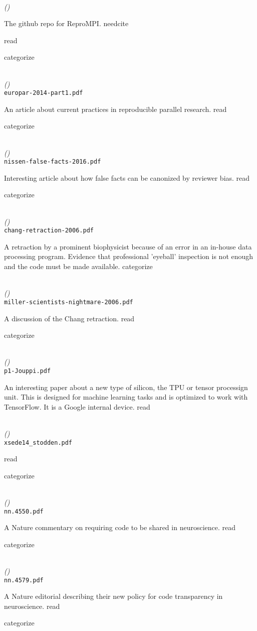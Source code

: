 \documentclass{article}
\newcommand{\Read}{
	\gls{read}
}
\newcommand{\categorize}{
	\gls{categorize}
}
\newcommand{\needcite}{
	\gls{needcite}
}
\newenvironment{refdef}[2] {
	\noindent \textbf{\citetitle{#1}} \cite{#1}\\ \citejournalorbooktitle{#1} \textit{(\citeyear{#1})}\\ \texttt{#2} \vspace{0.2in} \par 
} {
\vspace{0.2in}
}
\begin{document}
\begin{refdef}{reprompi}{}
The github repo for ReproMPI. \needcite \Read \categorize
\end{refdef}

\begin{refdef}{Carpen-Amarie-repro-research-2014}{europar-2014-part1.pdf}
An article about current practices in reproducible parallel research. \Read \categorize
\end{refdef}

\begin{refdef}{nissen-false-facts-2016}{nissen-false-facts-2016.pdf}
Interesting article about how false facts can be canonized by reviewer bias. \Read \categorize
\end{refdef}

\begin{refdef}{chang-retraction-2006}{chang-retraction-2006.pdf}
A retraction by a prominent biophysicist because of an error in an in-house data processing program. Evidence that professional 'eyeball' inspection is not enough and the code must be made available. \categorize
\end{refdef}

\begin{refdef}{miller-scientists-nightmare-2006}{miller-scientists-nightmare-2006.pdf}
A discussion of the Chang retraction. \Read \categorize
\end{refdef}

\begin{refdef}{jouppi-tpu-performance-2017}{p1-Jouppi.pdf}
An interesting paper about a new type of silicon, the TPU or tensor processign unit. This is designed for machine learning tasks and is optimized to work with TensorFlow. It is a Google internal device. \Read \cateogorize
\end{refdef}

\begin{refdef}{stodden-provisioning-repro-science-2014}{xsede14\_stodden.pdf}
\Read \categorize
\end{refdef}

\begin{refdef}{Eglen2017}{nn.4550.pdf}
A Nature commentary on requiring code to be shared in neuroscience. \Read \categorize
\end{refdef}

\begin{refdef}{nature-transparency-2017}{nn.4579.pdf}
A Nature editorial describing their new policy for code transparency in neuroscience. \Read \categorize
\end{refdef}
\end{document}

